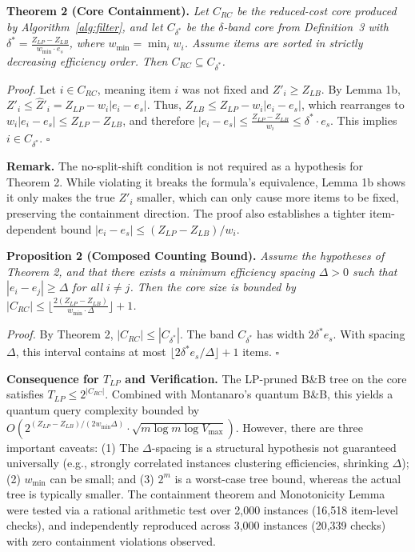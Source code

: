 \documentclass[conference]{IEEEtran}
\begin{document}
\textbf{Theorem 2 (Core Containment).} \textit{Let $C_{RC}$ be the reduced-cost core produced by Algorithm~\ref{alg:filter}, and let $C_{\delta^*}$ be the $\delta$-band core from Definition~3 with $\delta^* = \frac{Z_{LP} - Z_{LB}}{w_{\min} \cdot e_s}$, where $w_{\min} = \min_{i} w_i$. Assume items are sorted in strictly decreasing efficiency order. Then $C_{RC} \subseteq C_{\delta^*}$.}

\textit{Proof.} Let $i \in C_{RC}$, meaning item $i$ was not fixed and $Z'_i \ge Z_{LB}$. By Lemma 1b, $Z'_i \le \hat{Z}'_i = Z_{LP} - w_i |e_i - e_s|$. Thus, $Z_{LB} \le Z_{LP} - w_i |e_i - e_s|$, which rearranges to $w_i |e_i - e_s| \le Z_{LP} - Z_{LB}$, and therefore $|e_i - e_s| \le \frac{Z_{LP} - Z_{LB}}{w_i} \le \delta^* \cdot e_s$. This implies $i \in C_{\delta^*}$. $\square$

\textbf{Remark.} The no-split-shift condition is not required as a hypothesis for Theorem 2. While violating it breaks the formula's equivalence, Lemma 1b shows it only makes the true $Z'_i$ smaller, which can only cause more items to be fixed, preserving the containment direction. The proof also establishes a tighter item-dependent bound $|e_i - e_s| \le (Z_{LP} - Z_{LB})/w_i$.

\textbf{Proposition 2 (Composed Counting Bound).} \textit{Assume the hypotheses of Theorem 2, and that there exists a minimum efficiency spacing $\Delta > 0$ such that $|e_i - e_j| \ge \Delta$ for all $i \ne j$. Then the core size is bounded by $|C_{RC}| \le \lfloor \frac{2(Z_{LP} - Z_{LB})}{w_{\min} \cdot \Delta} \rfloor + 1$.}

\textit{Proof.} By Theorem 2, $|C_{RC}| \le |C_{\delta^*}|$. The band $C_{\delta^*}$ has width $2 \delta^* e_s$. With spacing $\Delta$, this interval contains at most $\lfloor 2\delta^* e_s / \Delta \rfloor + 1$ items. $\square$

\textbf{Consequence for $T_{LP}$ and Verification.} The LP-pruned B\&B tree on the core satisfies $T_{LP} \le 2^{|C_{RC}|}$. Combined with Montanaro's quantum B\&B, this yields a quantum query complexity bounded by $O(2^{(Z_{LP} - Z_{LB})/(2 w_{\min} \Delta)} \cdot \sqrt{m \log m \log V_{\max}})$. However, there are three important caveats: (1) The $\Delta$-spacing is a structural hypothesis not guaranteed universally (e.g., strongly correlated instances clustering efficiencies, shrinking $\Delta$); (2) $w_{\min}$ can be small; and (3) $2^m$ is a worst-case tree bound, whereas the actual tree is typically smaller.
The containment theorem and Monotonicity Lemma were tested via a rational arithmetic test over 2,000 instances (16,518 item-level checks), and independently reproduced across 3,000 instances (20,339 checks) with zero containment violations observed.
\end{document}
